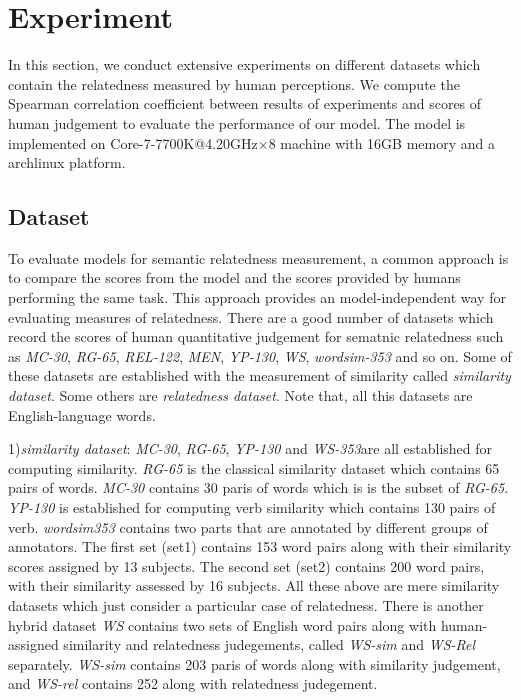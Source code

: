 \section{Experiment}
In this section, we conduct extensive experiments on different datasets which
contain the relatedness measured by human perceptions. We compute the Spearman
correlation coefficient between results of experiments and scores of human judgement
to evaluate the performance of our model. The model is implemented on 
Core-7-7700K@4.20GHz$\times$8 machine with 16GB memory and a archlinux platform.
 
\subsection{Dataset}
To evaluate models for semantic relatedness measurement, a common approach is to compare
the scores from the model and the scores provided by humans performing the same task.
This approach provides an model-independent way for evaluating measures of relatedness.
There are a good number of datasets which record the scores of human quantitative judgement
for sematnic relatedness such as \emph{MC-30}\cite{MC30/Miller02}, \emph{RG-65}\cite{RG65/RubensteinG65}, 
\emph{REL-122}\cite{acl/SzumlanskiGS13}, \emph{MEN}\cite{MEN/BruniTB14}, 
\emph{YP-130}\cite{YP130/Yang06verbsimilarity}, \emph{WS}\cite{ws/AgirreAHKPS09},
\emph{wordsim-353}\cite{wordsim353/FinkelsteinGMRSWR02}
and so on. Some of these datasets are established with the measurement of 
similarity called \emph{similarity dataset}. Some others are \emph{relatedness dataset}.
Note that, all this datasets are English-language words.

1)\emph{similarity dataset}:
\emph{MC-30}, \emph{RG-65}, \emph{YP-130} and \emph{WS-353}are all established for computing similarity.
\emph{RG-65} is the classical similarity dataset which contains 65 pairs of words.
\emph{MC-30} contains 30 paris of words which is is the subset of \emph{RG-65}.
\emph{YP-130} is established for computing verb similarity which contains 130 pairs of verb.
\emph{wordsim353} contains two parts that are annotated by different groups of annotators.
The first set (set1) contains 153 word pairs along with their similarity scores assigned by 13 subjects. 
The second set (set2) contains 200 word pairs, with their similarity assessed by 16 subjects.
All these above are mere similarity datasets which just consider a particular case of relatedness.
There is another hybrid dataset \emph{WS} contains two sets of English word pairs along
with human-assigned similarity and relatedness judegements, called \emph{WS-sim} and \emph{WS-Rel} separately.
\emph{WS-sim} contains 203 paris of words along with similarity judgement,
and \emph{WS-rel} contains 252 along with relatedness judegement.


